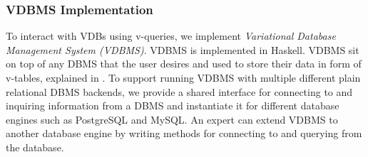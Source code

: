 \subsubsection{VDBMS Implementation}
\label{sec:impl}


To interact with VDBs using v-queries, we implement 
\emph{Variational Database Management System (VDBMS)}.
VDBMS is implemented in Haskell. VDBMS sit on 
top of any DBMS that the user desires and used to store their data 
in form of v-tables, explained in .
To support running VDBMS with multiple different plain relational DBMS backends,
we provide
a shared interface
for connecting to and inquiring information from a DBMS and
instantiate it for different database engines such as PostgreSQL and
MySQL. 
An expert can extend VDBMS to another database engine by
writing methods for connecting to and querying from the database.

%

%

